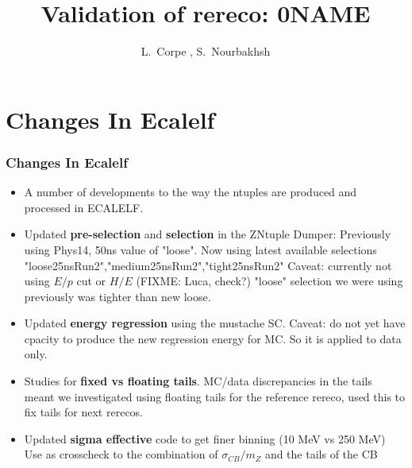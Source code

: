 \documentclass[8pt,serif]{beamer}
\title{Validation of rereco: 0NAME}
\author{L.~Corpe \inst{1}, S.~Nourbakhsh \inst{2}}
\institute[shortinst]{\inst{1} Imperial College London \and %
                      \inst{2} University of Minnesota}
\begin{document}
\begin{frame}
\titlepage
\end{frame}
\begin{frame}
\tableofcontents
\end{frame}
\usebackgroundtemplate{
	\texttt{[image: ]}%
}

\color{titlecolor}
\section{Changes In Ecalelf}
\begin{frame}
\frametitle{Changes In Ecalelf}

\vspace{10mm}

\begin{itemize}
\item A number of developments to the way the ntuples are produced and processed in ECALELF.
\item Updated \textbf{pre-selection} and \textbf{selection} in the ZNtuple Dumper:
\subitem Previously using Phys14, 50ns value of "loose".
\subitem Now using latest available selections "loose25nsRun2","medium25nsRun2","tight25nsRun2"
\subitem Caveat: currently not using $E/p$ cut or $H/E$ (FIXME: Luca, check?)
\subitem "loose" selection we were using previously was tighter than new loose. 
\item Updated \textbf{energy regression} using the mustache SC.
\subitem Caveat: do not yet have cpacity to produce the new regression energy for MC. So it is applied to data only.
\item Studies for \textbf{fixed vs floating tails}. MC/data discrepancies in the tails meant we investigated using floating tails for the reference rereco, used this to fix tails for next rerecos.
\item Updated \textbf{sigma effective} code to get finer binning (10 MeV vs 250 MeV)
\subitem Use as crosscheck to the combination of $\sigma_{CB}/m_{Z}$ and the tails of the CB
\end{itemize}
\end{frame}
\end{document}
